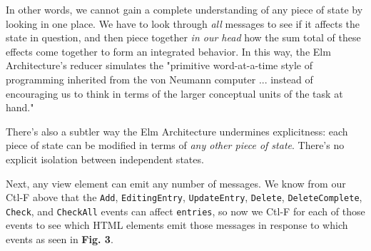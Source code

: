 \documentclass[sigconf]{acmart}
\begin{document}
In other words, we cannot gain a complete understanding of any piece of state by looking in one place. We have to look through \textit{all} messages to see if it affects the state in question, and then piece together \textit{in our head} how the sum total of these effects come together to form an integrated behavior. In this way, the Elm Architecture's reducer simulates the "primitive word-at-a-time style of programming inherited from the von Neumann computer ... instead of encouraging us to think in terms of the larger conceptual units of the task at hand."\cite{Backus:1978:PLV:359576.359579}

There's also a subtler way the Elm Architecture undermines explicitness: each piece of state can be modified in terms of \textit{any other piece of state}. There's no explicit isolation between independent states. 

Next, any view element can emit any number of messages. We know from our Ctl-F above that the \lstinline{Add}, \lstinline{EditingEntry}, \lstinline{UpdateEntry}, \lstinline{Delete}, \lstinline{DeleteComplete}, \lstinline{Check}, and \lstinline{CheckAll} events can affect \lstinline{entries}, so now we Ctl-F for each of those events to see which HTML elements emit those messages in response to which events as seen in \textbf{Fig. 3}. 
\end{document}

